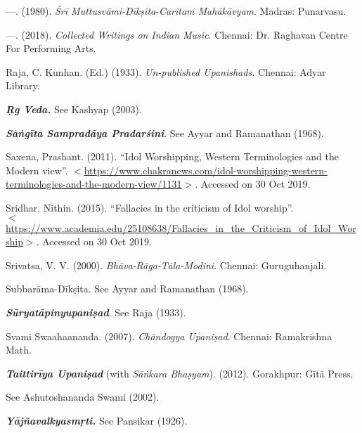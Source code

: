 \begin{thebibliography}{99}
  —. (1980). \textit{Śrī Muttusvāmi-Dīkṣita}-\textit{Caritam Mahākāvyam}. Madras: Punarvasu.

  —. (2018). \textit{Collected Writings on Indian Music}. Chennai: Dr. Raghavan Centre For Performing Arts.

  Raja, C. Kunhan. (Ed.) (1933). \textit{Un-published Upanishads.} Chennai: Adyar Library.

  \textbf{\textit{Ṛg Veda.}} See Kashyap (2003).
 
  \textbf{\textit{Saṅgīta Sampradāya Pradarśini}}.  See Ayyar and Ramanathan (1968).

  Saxena, Prashant. (2011). “Idol Worshipping, Western Terminologies and the Modern view”. $<$\url{https://www.chakranews.com/idol-worshipping-western-terminologies-and-the-modern-view/1131}$>$. Accessed on 30 Oct 2019.

  Sridhar, Nithin. (2015). “Fallacies in the criticism of Idol worship”.\\ $<$\url{https://www.academia.edu/25108638/Fallacies_in_the_Criticism_of_Idol_Worship}$>$. Accessed on 30 Oct 2019.

  Srivatsa, V. V. (2000). \textit{Bhāva-Rāga-Tāla-Modini}. Chennai: Guruguhanjali.

  Subbarāma-Dīkṣita. See Ayyar and Ramanathan (1968).

  \textbf{\textit{Sūryatāpinyupaniṣad}}. See Raja (1933).

  Svami Swaahaananda. (2007).\textit{ Chāndogya Upaniṣad}. Chennai: Rama\-krishna Math.

  \textbf{\textit{Taittirīya Upaniṣad}} (with \textit{Sāṅkara Bhaṣyam}). (2012). Gorakhpur: Gītā Press.

  \hspace{.5cm}See Ashutoshananda Swami (2002).

  \textbf{\textit{Yājñavalkyasmṛti.}} See Pansikar (1926).

 \end{thebibliography}

\theendnotes
\label{endchapter1}
